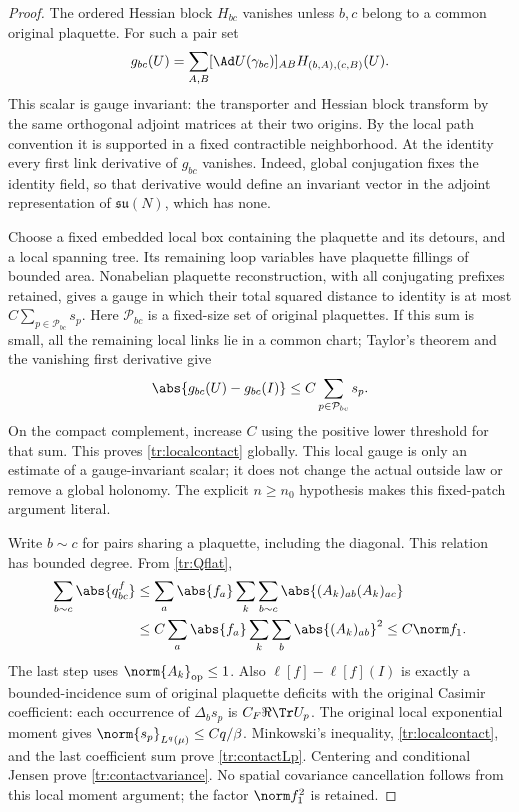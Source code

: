 \begin{proof}
The ordered Hessian block \(H_{bc}\) vanishes unless \(b,c\) belong to a
common original plaquette. For such a pair set
\[
 g_{bc}(U)=\sum_{A,B}[\Ad U(\gamma_{bc})]_{AB}
                         H_{(b,A),(c,B)}(U).
\]
This scalar is gauge invariant: the transporter and Hessian block transform
by the same orthogonal adjoint matrices at their two origins. By the local
path convention it is supported in a fixed contractible neighborhood.
At the identity every first link derivative of \(g_{bc}\) vanishes. Indeed,
global conjugation fixes the identity field, so that derivative would define
an invariant vector in the adjoint representation of \(\mathfrak{su}(N)\),
which has none.

Choose a fixed embedded local box containing the plaquette and its detours,
and a local spanning tree. Its remaining loop variables have plaquette
fillings of bounded area. Nonabelian plaquette reconstruction, with all
conjugating prefixes retained, gives a gauge in which their total squared
distance to identity is at most \(C\sum_{p\in\mathcal P_{bc}}s_p\).
Here \(\mathcal P_{bc}\) is a fixed-size set of original plaquettes. If this
sum is small, all the remaining local links lie in a common chart; Taylor's
theorem and the vanishing first derivative give
\begin{equation}
 \abs{g_{bc}(U)-g_{bc}(I)}
      \le C\sum_{p\in\mathcal P_{bc}}s_p.
 \label{tr:localcontact}
\end{equation}
On the compact complement, increase \(C\) using the positive lower threshold
for that sum. This proves \eqref{tr:localcontact} globally. This local
gauge is only an estimate of a gauge-invariant scalar; it does not change
the actual outside law or remove a global holonomy. The explicit
\(n\ge n_0\) hypothesis makes this fixed-patch argument literal.

Write \(b\sim c\) for pairs sharing a plaquette, including the diagonal.
This relation has bounded degree. From \eqref{tr:Qflat},
\begin{align*}
 \sum_{b\sim c}\abs{q^f_{bc}}
 &\le\sum_a\abs{f_a}\sum_k\sum_{b\sim c}
                           \abs{(A_k)_{ab}(A_k)_{ac}}\\
 &\le C\sum_a\abs{f_a}\sum_k\sum_b\abs{(A_k)_{ab}}^2
 \le C\norm f_1.
\end{align*}
The last step uses \(\norm{A_k}_{\rm op}\le1\).
Also \(\ell[f]-\ell[f](I)\) is exactly a bounded-incidence sum of original
plaquette deficits with the original Casimir coefficient: each occurrence
of \(\Delta_bs_p\) is \(C_F\Re\Tr U_p\).
The original local exponential moment gives
\(\norm{s_p}_{L^q(\mu)}\le Cq/\beta\).
Minkowski's inequality, \eqref{tr:localcontact}, and the last coefficient
sum prove \eqref{tr:contactLp}. Centering and conditional Jensen prove
\eqref{tr:contactvariance}. No spatial covariance cancellation follows
from this local moment argument; the factor \(\norm f_1^2\) is retained.
\end{proof}

